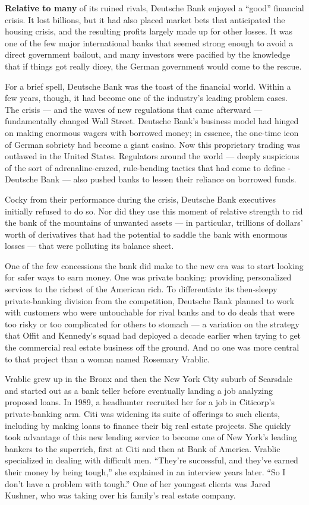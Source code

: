 \textbf{Relative to many} of its ruined rivals, ­Deutsche Bank enjoyed a
``good'' financial crisis. It lost billions, but it had also placed
market bets that anticipated the housing crisis, and the resulting
profits largely made up for other losses. It was one of the few major
international banks that seemed strong enough to avoid a direct
government bailout, and many investors were pacified by the knowledge
that if things got really dicey, the German government would come to the
rescue.

For a brief spell, ­Deutsche Bank was the toast of the financial world.
Within a few years, though, it had become one of the industry's leading
problem cases. The crisis --- and the waves of new regulations that came
afterward --- fundamentally changed Wall Street. ­Deutsche Bank's
business model had hinged on making enormous wagers with borrowed money;
in essence, the one-time icon of German sobriety had become a giant
casino. Now this proprietary trading was outlawed in the United States.
Regulators around the world --- deeply suspicious of the sort of
adrenaline-­crazed, rule-­bending tactics that had come to define
­Deutsche Bank --- also pushed banks to lessen their reliance on
borrowed funds.

Cocky from their performance during the crisis, ­Deutsche Bank
executives initially refused to do so. Nor did they use this moment of
relative strength to rid the bank of the mountains of unwanted assets
--- in particular, trillions of dollars' worth of derivatives that had
the potential to saddle the bank with enormous losses --- that were
polluting its balance sheet.

One of the few concessions the bank did make to the new era was to start
looking for safer ways to earn money. One was private banking: providing
personalized services to the richest of the American rich. To
differentiate its then-­sleepy private-­banking division from the
competition, ­Deutsche Bank planned to work with customers who were
untouchable for rival banks and to do deals that were too risky or too
complicated for others to stomach --- a variation on the strategy that
Offit and Kennedy's squad had deployed a decade earlier when trying to
get the commercial real estate business off the ground. And no one was
more central to that project than a woman named Rosemary Vrablic.

Vrablic grew up in the Bronx and then the New York City suburb of
Scarsdale and started out as a bank teller before eventually landing a
job analyzing proposed loans. In 1989, a headhunter recruited her for a
job in Citicorp's private-­banking arm. Citi was widening its suite of
offerings to such clients, including by making loans to finance their
big real estate projects. She quickly took advantage of this new lending
service to become one of New York's leading bankers to the superrich,
first at Citi and then at Bank of America. Vrablic specialized in
dealing with difficult men. ``They're successful, and they've earned
their money by being tough,'' she explained in an interview years later.
``So I don't have a problem with tough.'' One of her youngest clients
was Jared Kushner, who was taking over his family's real estate company.


